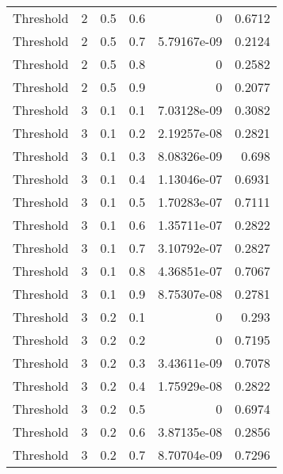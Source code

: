 \documentclass{article}
\begin{document}
\begin{longtable}[H]{lrrrrr}
 Threshold      &       2 &   0.5 &            0.6 &      0           &          0.6712 \\
 Threshold      &       2 &   0.5 &            0.7 &      5.79167e-09 &          0.2124 \\
 Threshold      &       2 &   0.5 &            0.8 &      0           &          0.2582 \\
 Threshold      &       2 &   0.5 &            0.9 &      0           &          0.2077 \\
 Threshold      &       3 &   0.1 &            0.1 &      7.03128e-09 &          0.3082 \\
 Threshold      &       3 &   0.1 &            0.2 &      2.19257e-08 &          0.2821 \\
 Threshold      &       3 &   0.1 &            0.3 &      8.08326e-09 &          0.698  \\
 Threshold      &       3 &   0.1 &            0.4 &      1.13046e-07 &          0.6931 \\
 Threshold      &       3 &   0.1 &            0.5 &      1.70283e-07 &          0.7111 \\
 Threshold      &       3 &   0.1 &            0.6 &      1.35711e-07 &          0.2822 \\
 Threshold      &       3 &   0.1 &            0.7 &      3.10792e-07 &          0.2827 \\
 Threshold      &       3 &   0.1 &            0.8 &      4.36851e-07 &          0.7067 \\
 Threshold      &       3 &   0.1 &            0.9 &      8.75307e-08 &          0.2781 \\
 Threshold      &       3 &   0.2 &            0.1 &      0           &          0.293  \\
 Threshold      &       3 &   0.2 &            0.2 &      0           &          0.7195 \\
 Threshold      &       3 &   0.2 &            0.3 &      3.43611e-09 &          0.7078 \\
 Threshold      &       3 &   0.2 &            0.4 &      1.75929e-08 &          0.2822 \\
 Threshold      &       3 &   0.2 &            0.5 &      0           &          0.6974 \\
 Threshold      &       3 &   0.2 &            0.6 &      3.87135e-08 &          0.2856 \\
 Threshold      &       3 &   0.2 &            0.7 &      8.70704e-09 &          0.7296 \\

\end{longtable}
\end{document}
